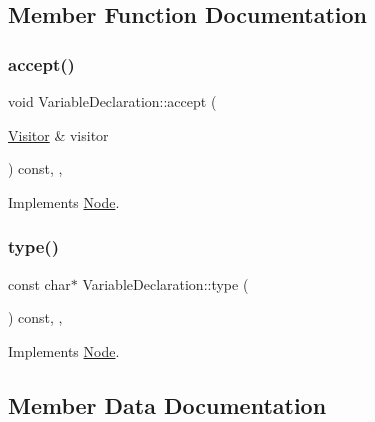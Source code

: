 \subsection{Member Function Documentation}
\mbox{\label{struct_variable_declaration_abdf0b5eed5200357de1bd9bf5ce6f6b3}} 
\subsubsection{\texorpdfstring{accept()}{accept()}}
{\footnotesize\ttfamily void Variable\+Declaration\+::accept (\begin{DoxyParamCaption}\item[{\hyperlink{struct_visitor}{Visitor} \&}]{visitor }\end{DoxyParamCaption}) const\hspace{0.3cm}{\ttfamily [inline]}, {\ttfamily [override]}, {\ttfamily [virtual]}}



Implements \hyperlink{struct_node_a10bd7af968140bbf5fa461298a969c71}{Node}.

\mbox{\label{struct_variable_declaration_ad3a4af0a986f42e3655d1b2f174c9494}} 
\subsubsection{\texorpdfstring{type()}{type()}}
{\footnotesize\ttfamily const char$\ast$ Variable\+Declaration\+::type (\begin{DoxyParamCaption}{ }\end{DoxyParamCaption}) const\hspace{0.3cm}{\ttfamily [inline]}, {\ttfamily [override]}, {\ttfamily [virtual]}}



Implements \hyperlink{struct_node_a82f29420d0a38efcc370352528e94e9b}{Node}.



\subsection{Member Data Documentation}
\mbox{\label{struct_variable_declaration_af00ca23e243d1ab865fd094c9be7a5c9}} 
